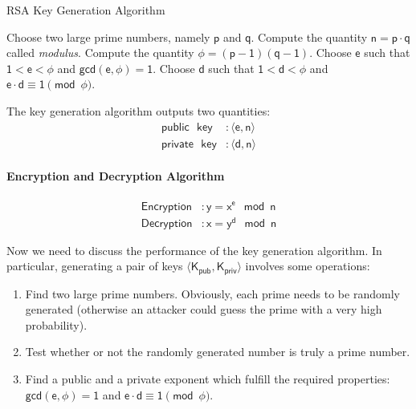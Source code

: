 \documentclass{article}
\begin{document}
\begin{algorithm}
\caption{RSA Key Generation Algorithm}
\label{alg:key_generation}
\begin{algorithmic}[1]
    \State Choose two large prime numbers, namely $\mathsf{p}$ and $\mathsf{q}$.
    \State Compute the quantity $\mathsf{n = p \cdot q}$ called \textit{modulus}.
    \State Compute the quantity $\mathsf{\phi = (p-1)(q-1)}$.
    \State Choose $\mathsf{e}$ such that $\mathsf{1 < e < \phi}$ and $\mathsf{gcd(e, \phi) = 1}$.
    \State Choose $\mathsf{d}$ such that $\mathsf{1 < d  < \phi}$ and $\mathsf{e \cdot d \equiv 1 \pmod{\phi}}$.
\end{algorithmic}
\end{algorithm}

\par \noindent The key generation algorithm outputs two quantities:
\begin{align*}
    \mathsf{public} \text{ } \mathsf{key} &: \mathsf{\langle e, n \rangle} \\
    \mathsf{private} \text{ } \mathsf{key} &: \mathsf{\langle d, n \rangle} 
\end{align*}

\paragraph{Encryption and Decryption Algorithm}
\begin{align*}
    \mathsf{Encryption} &: \mathsf{y = x^{e} \mod n} \\
    \mathsf{Decryption} &: \mathsf{x = y^{d} \mod n}
\end{align*}

\par \noindent Now we need to discuss the performance of the key generation algorithm. In particular, generating a pair of keys $\mathsf{\langle K_{pub}, K_{priv} \rangle}$ involves some operations:

\begin{enumerate}
    \item Find two large prime numbers. Obviously, each prime needs to be randomly generated (otherwise an attacker could guess the prime with a very high probability). 
    \item Test whether or not the randomly generated number is truly a prime number.
    \item Find a public and a private exponent which fulfill the required properties: $\mathsf{gcd(e, \phi) = 1}$ and $\mathsf{e \cdot d \equiv 1 \pmod{\phi}}$.
\end{enumerate}
\end{document}
